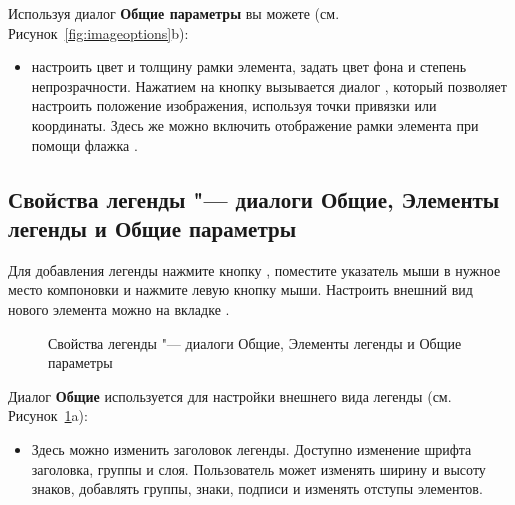 
Используя диалог \textbf{Общие параметры} вы можете
(см. Рисунок~\ref{fig:imageoptions}b):

\begin{itemize}[label=--]
\item настроить цвет и толщину рамки элемента, задать
цвет фона и степень непрозрачности. Нажатием на кнопку 
вызывается диалог , который позволяет
настроить положение изображения, используя точки привязки или координаты.
Здесь же можно включить отображение рамки элемента при помощи флажка
.
\end{itemize}

\subsection{Свойства легенды "--- диалоги Общие, Элементы легенды и Общие параметры}

Для добавления легенды нажмите кнопку
, поместите указатель
мыши в нужное место компоновки и нажмите левую кнопку мыши. Настроить
внешний вид нового элемента можно на вкладке .

\begin{figure}[h]
\centering
   \hspace{1cm}
   \hspace{1cm}
   \caption{Свойства легенды "--- диалоги Общие, Элементы легенды и Общие параметры \wincaption}\label{fig:legendoptions}
\end{figure}


Диалог \textbf{Общие} используется для настройки внешнего вида
легенды (см. Рисунок~\ref{fig:legendoptions}a):

\begin{itemize}[label=--]
\item Здесь можно изменить заголовок легенды. Доступно изменение шрифта
заголовка, группы и слоя. Пользователь может изменять ширину и высоту
знаков, добавлять группы, знаки, подписи и изменять отступы элементов.
\end{itemize}

